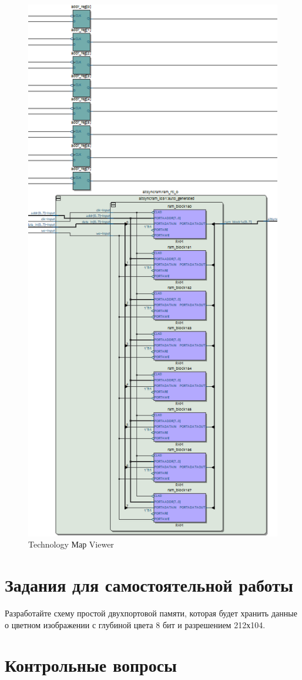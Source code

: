 \documentclass[a4paper,14pt]{article}
\begin{document}
	\begin{figure}[H]
		\centering
		\includegraphics[width=0.65\linewidth]{images/z1_tmv}
		\caption{Technology Мар Viewer}
		\label{fig:z1_tmv}
	\end{figure}

	
	
	\section{Задания для самостоятельной работы}
	
	Разработайте схему простой двухпортовой памяти, которая будет хранить данные о
	цветном изображении с глубиной цвета 8 бит и разрешением 212х104.
			
	\section{Контрольные вопросы}
	
\end{document}

